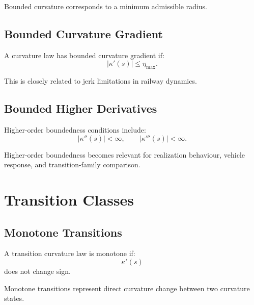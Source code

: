 Bounded curvature corresponds to a minimum admissible radius.


\subsection{Bounded Curvature Gradient}

\begin{definition}
\label{def:bounded-curvature-gradient}
A curvature law has bounded curvature gradient if:
\[
|\kappa'(s)|
\le
\eta_{\max}.
\]
\end{definition}

This is closely related to jerk limitations in railway dynamics.


\subsection{Bounded Higher Derivatives}

\begin{definition}
\label{def:bounded-higher-curvature-derivatives}
Higher-order boundedness conditions include:
\[
|\kappa''(s)|<\infty,
\qquad
|\kappa'''(s)|<\infty.
\]
\end{definition}

Higher-order boundedness becomes relevant for realization behaviour,
vehicle response, and transition-family comparison.

\section{Transition Classes}

\subsection{Monotone Transitions}

\begin{definition}
\label{def:monotone-transition}
A transition curvature law is monotone if:
\[
\kappa'(s)
\]
does not change sign.
\end{definition}

Monotone transitions represent direct curvature change between two
curvature states.

